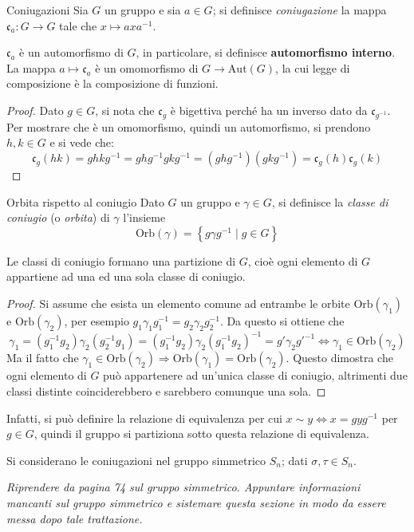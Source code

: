 \documentclass[11pt, a4paper]{scrartcl}
\theoremstyle{definition}
\numberwithin{esempio}{section}
\theoremstyle{definition}
\numberwithin{obs}{section}
\numberwithin{nota}{section}
\numberwithin{equation}{subsection}
\begin{document}
\begin{definizione}
	{Coniugazioni}{}
	Sia $G$ un gruppo e sia $a \in G$; si definisce \textit{coniugazione} la mappa $\mathfrak{c} _a : G \to G$ tale che $x\mapsto axa^{-1} $.
\end{definizione}
\begin{prop}
	{}{}
$\mathfrak{c} _a$ \`e un automorfismo di $G$, in particolare, si definisce \textbf{automorfismo interno}.
La mappa $a \mapsto \mathfrak{c} _a$ \`e un omomorfismo di $G \to \mathrm{Aut} (G)$, la cui legge di composizione \`e la composizione di funzioni.
\begin{proof}
	Dato $g \in G$, si nota che $\mathfrak{c}_g$ \`e bigettiva perch\'e ha un inverso dato da $\mathfrak{c}_{g^{-1} } $.
	Per mostrare che \`e un omomorfismo, quindi un automorfismo, si prendono $h,k \in G$ e si vede che:
	\[
		\mathfrak{c}_g(hk) = ghkg^{-1} = ghg^{-1} gkg^{-1} = (ghg^{-1} )(gkg^{-1} ) = \mathfrak{c}_g(h)\mathfrak{c}_g(k)
	\] 
\end{proof}
\end{prop}
\begin{definizione}
	{Orbita rispetto al coniugio}{}
	Dato $G$ un gruppo e $\gamma\in G$, si definisce la \textit{classe di coniugio} (o \textit{orbita}) di $\gamma$ l'insieme
	\[
	\mathrm{Orb} (\gamma) = \left\{ g \gamma g^{-1}  \mid g \in G \right\} 
	\] 
\end{definizione}
\noindent Le classi di coniugio formano una partizione di $G$, cio\`e ogni elemento di $G$ appartiene ad una ed una sola classe di coniugio.
\begin{proof}
	Si assume che esista un elemento comune ad entrambe le orbite $\mathrm{Orb} (\gamma_1)$ e $\mathrm{Orb} (\gamma_2)$, per esempio $g_1 \gamma_1 g_1^{-1} = g_2\gamma_2 g^{-1} _2$.
	Da questo si ottiene che 
	\[
		\gamma_1 = (g_1^{-1} g_2) \gamma_2 (g_2^{-1} g_1)= (g_1^{-1} g_2) \gamma_2 (g_1^{-1}  g_2)^{-1} = g' \gamma_2 g'^{-1} \iff \gamma_1 \in \mathrm{Orb} (\gamma_2)
	\] 
	Ma il fatto che $\gamma_1 \in \mathrm{Orb}(\gamma_2) \Rightarrow \mathrm{Orb} (\gamma_1) = \mathrm{Orb} (\gamma_2)$.
	Questo dimostra che ogni elemento di $G$ pu\`o appartenere ad un'unica classe di coniugio, altrimenti due classi distinte coinciderebbero e sarebbero comunque una sola.
\end{proof}
	\noindent Infatti, si pu\`o definire la relazione di equivalenza per cui $x \sim y \iff x = gyg^{-1} $ per $g \in G$, quindi il gruppo si partiziona sotto questa relazione di equivalenza.

	Si considerano le coniugazioni nel gruppo simmetrico $S_n$; dati $\sigma , \tau \in S_n$.
	\begin{center}
		\textit{\color{red}Riprendere da pagina 74 sul gruppo simmetrico. Appuntare informazioni mancanti sul gruppo simmetrico e sistemare questa sezione in modo da essere messa dopo tale trattazione.}
	\end{center}
\end{document}
